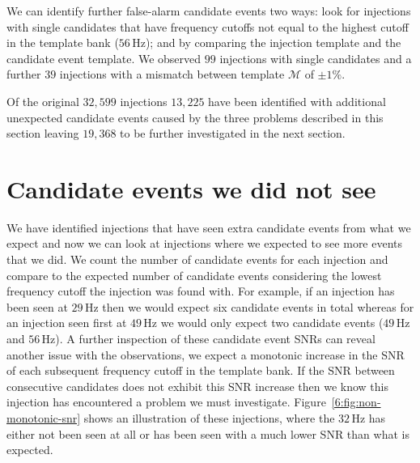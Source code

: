We can identify further false-alarm candidate events two ways: look for injections with single candidates that have frequency cutoffs not equal to the highest cutoff in the template bank ($56 \, \text{Hz}$); and by comparing the injection template and the candidate event template. We observed $99$ injections with single candidates and a further $39$ injections with a mismatch between template $\mathcal{M}$ of ${\pm}1\%$.

Of the original $32,599$ injections $13,225$ have been identified with additional unexpected candidate events caused by the three problems described in this section leaving $19,368$ to be further investigated in the next section.

\section{\label{6:sec:outside-coinc-window}Candidate events we did not see}


We have identified injections that have seen extra candidate events from what we expect and now we can look at injections where we expected to see more events that we did. We count the number of candidate events for each injection and compare to the expected number of candidate events considering the lowest frequency cutoff the injection was found with. For example, if an injection has been seen at $29 \, \text{Hz}$ then we would expect six candidate events in total whereas for an injection seen first at $49 \, \text{Hz}$ we would only expect two candidate events ($49 \, \text{Hz}$ and $56 \, \text{Hz}$). A further inspection of these candidate event SNRs can reveal another issue with the observations, we expect a monotonic increase in the SNR of each subsequent frequency cutoff in the template bank. If the SNR between consecutive candidates does not exhibit this SNR increase then we know this injection has encountered a problem we must investigate. Figure~\ref{6:fig:non-monotonic-snr} shows an illustration of these injections, where the 
$32 \, \text{Hz}$ has either not been seen at all or has been seen with a much lower SNR than what is expected.

